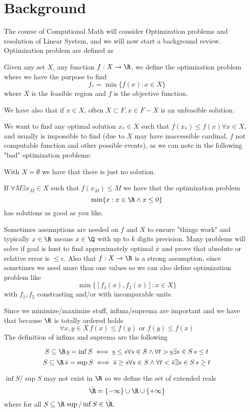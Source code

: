 \chapter{Background}
The course of Computional Math will consider Optimization problems and resolution of Linear System,
and we will now start a background review.\newline
Optimization problem are defined as 
\begin{defi}
    Given any set $X$, any function $f:X \to \R$, we define the optimization problem where we have
    the purpose to find 
    \[ f_* = \min \{f(x): x \in X\} \]
    where $X$ is the feasible region and $f$ is the objective function.
\end{defi}
We have also that if $x \in X$, often $X \subset F, x \in F - X$ is an unfeasible solution.

We want to find any optimal solution $x_* \in X$ such that $f(x_*) \leq f(x) \forall x \in X$,
and usually is impossible to find (due to $X$ may have inaccessible cardinal, $f$ not computable 
function and other possible events), as we can note in the following "bad" optimization problems:
\begin{example}
   With $X = \emptyset$ we have that there is just no solution.

   If $\forall M \exists x_M \in X$ such that $f(x_M) \leq M$ we have that the optimization problem
   \[ \min \{x: x \in \R \land x \leq 0 \} \]
   has solutions as good as you like.
\end{example}
Sometimes assumptions are needed on $f$ and $X$ to ensure "things work" and typically $x \in \R$
means $x \in \Q$ with up to $k$ digits precision.\newline
Many problems will solve if goal is hust to find approximately optimal $\bar{x}$ and prove that 
absolute or relative error is $\leq \epsilon$.\newline
Also that $f:X \to \R$ is a strong assumption, since sometimes we need more than one values so
we can also define optimization problem like
\[ \min \{[f_1(x), f_2(x)]: x \in X\} \]
with $f_1, f_2$ constrasting and/or with incomparable units.

Since we minimize/maximize stuff, infima/suprema are important and we have that because $\R$ is 
totally ordered holds 
\[ \forall x, y \in X \, f(x) \leq f(y) \text{ or } f(y) \leq f(x) \]
The definition of infima and suprema are the following
\begin{defi}
    \[ S \subseteq \R \, \underbar{s} = \inf S \iff \underbar{s} \leq s \forall s \in S \land
                         \forall t > \underbar{s} \exists s \in S \, s \leq t \]
    \[ S \subseteq \R \, \bar{s} = \sup S \iff \bar{s} \geq s \forall s \in S \land
                         \forall t < \bar{s} \exists s \in S \, s \geq t \]
\end{defi}
$\inf S/ \sup S$ may not exist in $\R$ so we define the set of extended reals 
\[ \bar{\R} = \{ -\infty\} \cup \R \cup \{+\infty\} \]
where for all $S \subseteq \R \, \sup/\inf S \in \bar{\R}$.

